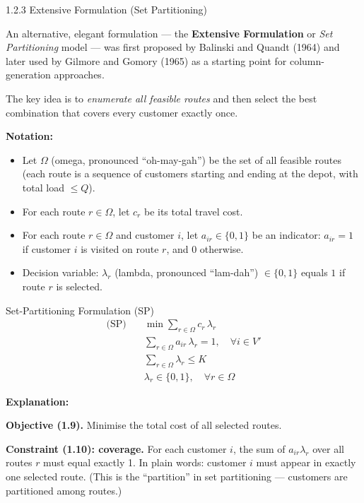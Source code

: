 \documentclass[aspectratio=169,10pt]{beamer}
\begin{document}
\begin{frame}[allowframebreaks]{1.2.3 Extensive Formulation (Set Partitioning)}

An alternative, elegant formulation --- the \textbf{Extensive Formulation} or
\emph{Set Partitioning} model --- was first proposed by Balinski and Quandt (1964)
and later used by Gilmore and Gomory (1965) as a starting point for column-generation
approaches.

The key idea is to \emph{enumerate all feasible routes} and then select the best
combination that covers every customer exactly once.

\medskip
\textbf{Notation:}
\begin{itemize}
  \item Let $\Omega$ (omega, pronounced ``oh-may-gah'') be the set of all feasible routes
        (each route is a sequence of customers starting and ending at the depot, with
        total load $\leq Q$).
  \item For each route $r \in \Omega$, let $c_r$ be its total travel cost.
  \item For each route $r \in \Omega$ and customer $i$, let $a_{ir} \in \{0, 1\}$ be
        an indicator: $a_{ir} = 1$ if customer $i$ is visited on route $r$, and
        $0$ otherwise.
  \item Decision variable: $\lambda_r$ (lambda, pronounced ``lam-dah'') $\in \{0, 1\}$
        equals $1$ if route $r$ is selected.
\end{itemize}

\begin{block}{Set-Partitioning Formulation (SP)}
\begin{align}
  \text{(SP)}\quad & \min \sum_{r \in \Omega} c_r\, \lambda_r
  \tag{1.9}\\[4pt]
  & \sum_{r \in \Omega} a_{ir}\, \lambda_r = 1, \quad \forall i \in V'
  \tag{1.10}\\[4pt]
  & \sum_{r \in \Omega} \lambda_r \leq K
  \tag{1.11}\\[4pt]
  & \lambda_r \in \{0, 1\}, \quad \forall r \in \Omega
  \tag{1.12}
\end{align}
\end{block}

\framebreak

\textbf{Explanation:}

\textbf{Objective (1.9).} Minimise the total cost of all selected routes.

\textbf{Constraint (1.10): coverage.}
For each customer $i$, the sum of $a_{ir} \lambda_r$ over all routes $r$ must equal
exactly 1.  In plain words: customer $i$ must appear in exactly one selected route.
(This is the ``partition'' in set partitioning --- customers are partitioned among routes.)


\end{frame}
\end{document}

